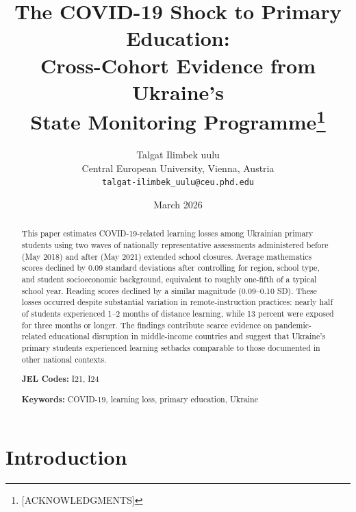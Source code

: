 \documentclass[12pt]{article}
\begin{document}
\title{The COVID-19 Shock to Primary Education:\\
       Cross-Cohort Evidence from Ukraine's\\
       State Monitoring Programme\thanks{[ACKNOWLEDGMENTS]}}

\author{Talgat Ilimbek uulu\\
        Central European University, Vienna, Austria\\
        \texttt{talgat-ilimbek\_uulu@ceu.phd.edu}}

\date{March 2026}

\maketitle

\begin{abstract}
\noindent
This paper estimates COVID-19-related learning losses among Ukrainian primary students
using two waves of nationally representative assessments administered before (May 2018)
and after (May 2021) extended school closures. Average mathematics scores declined by
0.09 standard deviations after controlling for region, school type, and student socioeconomic
background, equivalent to roughly one-fifth of a typical school year. Reading scores declined
by a similar magnitude (0.09--0.10 SD). These losses occurred despite substantial variation in
remote-instruction practices: nearly half of students experienced 1--2 months of distance
learning, while 13 percent were exposed for three months or longer. The findings contribute
scarce evidence on pandemic-related educational disruption in middle-income countries
and suggest that Ukraine's primary students experienced learning setbacks comparable to
those documented in other national contexts.

\medskip
\noindent \textbf{JEL Codes:} I21, I24

\medskip
\noindent \textbf{Keywords:} COVID-19, learning loss, primary education, Ukraine
\end{abstract}

\newpage

\section{Introduction}
\label{sec:intro}


\end{document}
